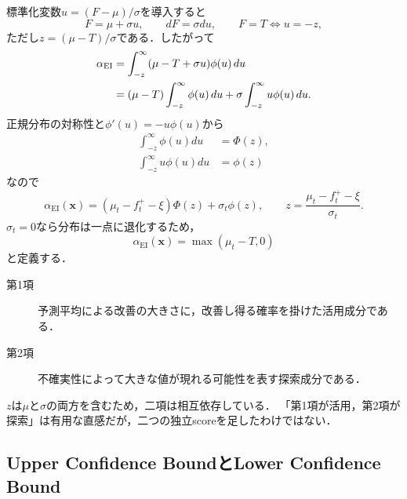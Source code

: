 \documentclass[a4paper,11pt]{ltjsarticle}
\begin{document}
標準化変数\(u=(F-\mu)/\sigma\)を導入すると
\begin{equation}
  F=\mu+\sigma u,
  \qquad dF=\sigma du,
  \qquad F=T\Longleftrightarrow u=-z,
\end{equation}
ただし\(z=(\mu-T)/\sigma\)である．したがって
\begin{align}
  \alpha_{\mathrm{EI}}
  &=\int_{-z}^{\infty}(\mu-T+\sigma u)\phi(u)\,du\notag\\
  &=(\mu-T)\int_{-z}^{\infty}\phi(u)\,du
  +\sigma\int_{-z}^{\infty}u\phi(u)\,du.
  \label{eq:ei-split-integral}
\end{align}
正規分布の対称性と\(\phi'(u)=-u\phi(u)\)から
\begin{align}
  \int_{-z}^{\infty}\phi(u)du&=\Phi(z),\\
  \int_{-z}^{\infty}u\phi(u)du&=\phi(z)
\end{align}
なので
\begin{equation}
  \boxed{
  \alpha_{\mathrm{EI}}(\bm x)
  =(\mu_t-f_t^+-\xi)\Phi(z)
  +\sigma_t\phi(z),
  \qquad
  z=\frac{\mu_t-f_t^+-\xi}{\sigma_t}.}
  \label{eq:ei-closed-form}
\end{equation}
\(\sigma_t=0\)なら分布は一点に退化するため，
\begin{equation}
  \alpha_{\mathrm{EI}}(\bm x)=\max(\mu_t-T,0)
\end{equation}
と定義する．

\begin{description}
  \item[第1項] 予測平均による改善の大きさに，改善し得る確率を掛けた活用成分である．
  \item[第2項] 不確実性によって大きな値が現れる可能性を表す探索成分である．
\end{description}

\begin{cautionbox}
\(z\)は\(\mu\)と\(\sigma\)の両方を含むため，二項は相互依存している．
「第1項が活用，第2項が探索」は有用な直感だが，二つの独立scoreを足したわけではない．
\end{cautionbox}

\subsection{Upper Confidence BoundとLower Confidence Bound}
\label{sec:ucb}
\end{document}
